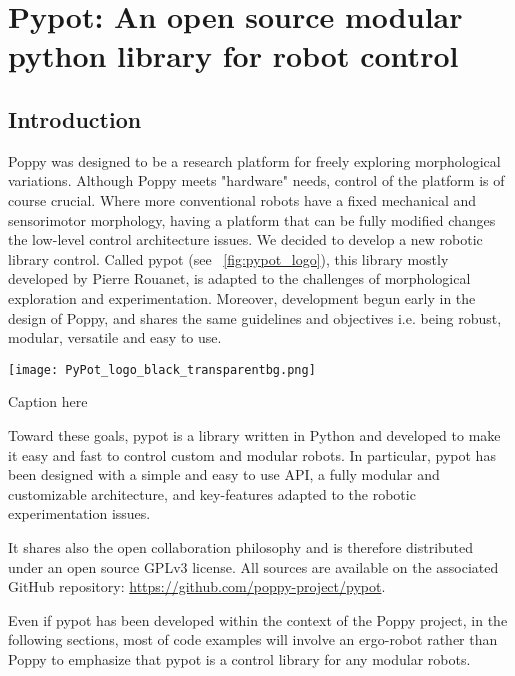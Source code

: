 
\cleartoleftpage

\chapter{Pypot: An open source modular python library for robot control} %

\section{Introduction} %

Poppy was designed to be a research platform for freely exploring morphological variations. Although Poppy meets "hardware" needs, control of the platform is of course crucial. Where more conventional robots have a fixed mechanical and sensorimotor morphology, having a platform that can be fully modified changes the low-level control architecture issues.
We decided to develop a new robotic library control. Called pypot (see \figurename~\ref{fig:pypot_logo}), this library mostly developed by Pierre Rouanet, is adapted to the challenges of morphological exploration and experimentation. Moreover, development begun early in the design of Poppy, and shares the same guidelines and objectives i.e. being robust, modular, versatile and easy to use.


\begin{NFfigure}
    \centering
        \texttt{[image: PyPot\_logo\_black\_transparentbg.png]}
    \caption{Caption here}
    \label{fig:figure1}
\end{NFfigure}

Toward these goals, pypot is a library written in Python and developed to make it easy and fast to control custom and modular robots. In particular, pypot has been designed with a simple and easy to use API, a fully modular and customizable architecture, and key-features adapted to the robotic experimentation issues.

It shares also the open collaboration philosophy and is therefore distributed under an open source GPLv3 license. All sources are available on the associated GitHub repository: \url{https://github.com/poppy-project/pypot}.

Even if pypot has been developed within the context of the Poppy project, in the following sections, most of code examples will involve an ergo-robot rather than Poppy to emphasize that pypot is a control library for any modular robots.



